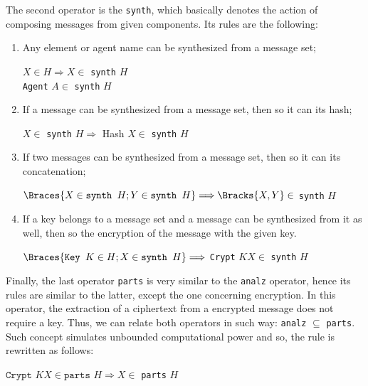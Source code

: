 The second operator is the \texttt{synth}, which basically denotes the action of composing messages from given components. Its rules are the following:

\begin{enumerate}
  \item Any element or agent name can be synthesized from a message set;
  \begin{center}
    $X \in H \Longrightarrow X \in$ \texttt{synth} $H$ \\
    \texttt{Agent} $A \in$ \texttt{synth} $H$
  \end{center}

  \item If a message can be synthesized from a message set, then so it can its hash;
  \begin{center}
    $X \in$ \texttt{synth} $H \Longrightarrow$ Hash $X \in$ \texttt{synth} $H$
  \end{center}

  \item If two messages can be synthesized from a message set, then so it can its concatenation;
  \begin{center}
    $\Braces{X \in \texttt{synth } H; Y \in \texttt{synth } H} \Longrightarrow \Bracks{X,Y} \in$ \texttt{synth} $H$
  \end{center}

  \item If a key belongs to a message set and a message can be synthesized from it as well, then so the encryption of the message with the given key.
  \begin{center}
    $\Braces{\texttt{Key } K \in H; X \in \texttt{synth } H} \Longrightarrow$ \texttt{Crypt} $K X \in$ \texttt{synth} $H$
  \end{center}
\end{enumerate}

Finally, the last operator \texttt{parts} is very similar to the \texttt{analz} operator, hence its rules are similar to the latter, except the one concerning encryption. In this operator, the extraction of a ciphertext from a encrypted message does not require a key. Thus, we can relate both operators in such way: \texttt{analz} $\subseteq$ \texttt{parts}. Such concept simulates unbounded computational power and so, the rule is rewritten as follows:

\begin{center}
  $\texttt{Crypt } K X \in \texttt{parts } H \Longrightarrow X \in$ \texttt{parts} $H$
\end{center}

